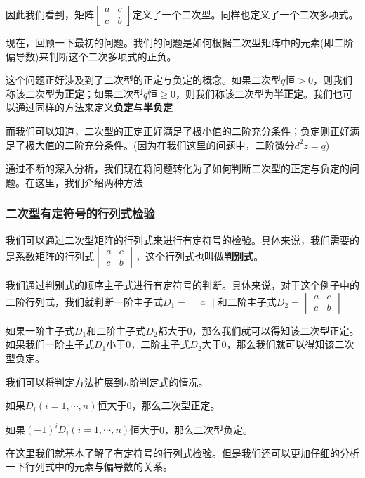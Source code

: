 \documentclass[UTF8,12pt]{ctexart}
\numberwithin{equation}{section} %
\numberwithin{figure}{section}
\numberwithin{table}{section}
\begin{document}
	因此我们看到，矩阵$\begin{bmatrix}
		a & c \\
		c & b
	\end{bmatrix}$定义了一个二次型。同样也定义了一个二次多项式。
	
	现在，回顾一下最初的问题。我们的问题是如何根据二次型矩阵中的元素(即二阶偏导数)来判断这个二次多项式的正负。
	
	这个问题正好涉及到了二次型的正定与负定的概念。如果二次型$q$恒$>0$，则我们称该二次型为\textbf{正定}；如果二次型$q$恒$\geqslant 0$，则我们称该二次型为\textbf{半正定}。我们也可以通过同样的方法来定义\textbf{负定}与\textbf{半负定}
	
	而我们可以知道，二次型的正定正好满足了极小值的二阶充分条件；负定则正好满足了极大值的二阶充分条件。(因为在我们这里的问题中，二阶微分$d^2z = q$)
	
	通过不断的深入分析，我们现在将问题转化为了如何判断二次型的正定与负定的问题。在这里，我们介绍两种方法
	
	\subsubsection{二次型有定符号的行列式检验}
	
	我们可以通过二次型矩阵的行列式来进行有定符号的检验。具体来说，我们需要的是系数矩阵的行列式$\begin{vmatrix}
		a & c \\
		c & b
	\end{vmatrix}$，这个行列式也叫做\textbf{判别式}。
	
	我们通过判别式的顺序主子式进行有定符号的判断。具体来说，对于这个例子中的二阶行列式，我们就判断一阶主子式$D_1 = \begin{vmatrix}
		a
	\end{vmatrix}$和二阶主子式$D_2 = \begin{vmatrix}
		a & c \\
		c & b
	\end{vmatrix}$
	
	如果一阶主子式$D_1$和二阶主子式$D_2$都大于0，那么我们就可以得知该二次型正定。如果我们一阶主子式$D_1$小于0，二阶主子式$D_2$大于0，那么我们就可以得知该二次型负定。
	
	我们可以将判定方法扩展到$n$阶判定式的情况。
	
	如果$D_i(i = 1,\cdots,n)$恒大于0，那么二次型正定。
	
	如果$(-1)^iD_i(i = 1,\cdots,n)$恒大于0，那么二次型负定。
	
	在这里我们就基本了解了有定符号的行列式检验。但是我们还可以更加仔细的分析一下行列式中的元素与偏导数的关系。
	
\end{document}
